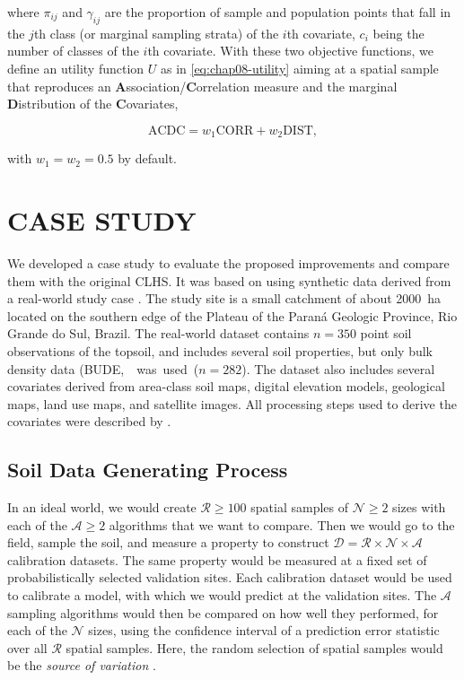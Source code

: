 \noindent where $\pi_{ij}$ and $\gamma_{ij}$ are the proportion of sample and population points that fall 
in the $j$th class (or marginal sampling strata) of the $i$th covariate, $c_i$ being the number of classes of 
the $i$th covariate. With these two objective functions, we define an utility function $U$ as in 
\autoref{eq:chap08-utility} aiming at a spatial sample that reproduces an 
\textbf{A}ssociation/\textbf{C}orrelation measure and the marginal \textbf{D}istribution of the 
\textbf{C}ovariates,

\begin{equation}
 \text{ACDC} = w_1\text{CORR} + w_2 \text{DIST},
\end{equation}\label{eq:chap08-acdc}

\noindent with $w_1 = w_2 = 0.5$ by default.

\section{CASE STUDY}

We developed a case study to evaluate the proposed improvements and compare them with the original CLHS. It 
was based on using synthetic data derived from a real-world study case \cite{Samuel-RosaEtAl2015}. The study 
site is a small catchment of about \SI{2000}{\hectare} located on the southern edge of the Plateau of the 
Paraná Geologic Province, Rio Grande do Sul, Brazil. The real-world dataset contains $n = 350$ point soil 
observations of the topsoil, and includes several soil properties, but only bulk density data 
(BUDE,~\si{\mega\gram\per\metre\cubic} was used ($n = 282$). The dataset also includes several covariates 
derived from area-class soil maps, digital elevation models, geological maps, land use maps, and satellite 
images. All processing steps used to derive the covariates were described by \citet{Samuel-RosaEtAl2015}.

\subsection{Soil Data Generating Process}
\label{subsec:simulation}

In an ideal world, we would create $\mathcal{R} \geq 100$ spatial samples of $\mathcal{N} \geq 2$ sizes 
with each of the $\mathcal{A} \geq 2$ algorithms that we want to compare. Then we would go to the field, 
sample the soil, and measure a property to construct $\mathcal{D} = \mathcal{R} \times \mathcal{N} \times 
\mathcal{A}$ calibration datasets. The same property would be measured at a fixed set of probabilistically 
selected validation sites. Each calibration dataset would be used to calibrate a model, with which we would 
predict at the validation sites. The $\mathcal{A}$ sampling algorithms would then be compared on how well 
they performed, for each of the $\mathcal{N}$ sizes, using the confidence interval of a prediction error 
statistic over all $\mathcal{R}$ spatial samples. Here, the random selection of spatial samples would be the 
\emph{source of variation} \cite{deGruijterEtAl1990}.


